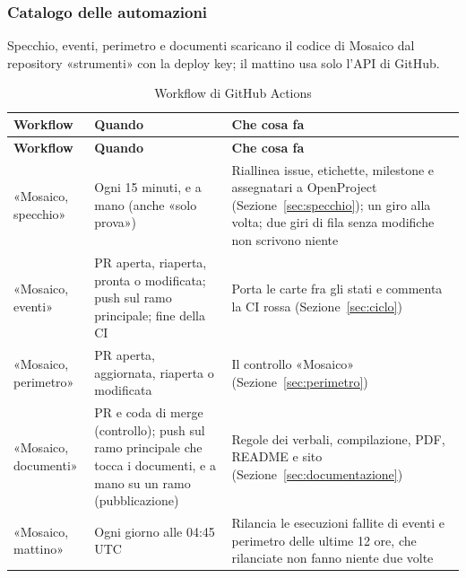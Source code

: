 \documentclass[a4paper, 11pt]{article}
\begin{document}
\subsubsection{Catalogo delle automazioni}\label{sec:automazioni}
Specchio, eventi, perimetro e documenti scaricano il codice di Mosaico dal repository «strumenti» con la deploy key; il mattino usa solo l'API di GitHub.

\begin{xltabular}{\textwidth}{@{} >{\raggedright\arraybackslash}p{0.2\textwidth} >{\raggedright\arraybackslash}p{0.27\textwidth} X @{}}
\caption{Workflow di GitHub Actions}\label{tab:workflow}\\
\toprule
\textbf{Workflow} & \textbf{Quando} & \textbf{Che cosa fa} \\
\midrule
\endfirsthead
\toprule
\textbf{Workflow} & \textbf{Quando} & \textbf{Che cosa fa} \\
\midrule
\endhead
«Mosaico, specchio» & Ogni 15 minuti, e a mano (anche «solo prova») & Riallinea issue, etichette, milestone e assegnatari a OpenProject (Sezione~\ref{sec:specchio}); un giro alla volta; due giri di fila senza modifiche non scrivono niente \\
«Mosaico, eventi» & PR aperta, riaperta, pronta o modificata; push sul ramo principale; fine della CI & Porta le carte fra gli stati e commenta la CI rossa (Sezione~\ref{sec:ciclo}) \\
«Mosaico, perimetro» & PR aperta, aggiornata, riaperta o modificata & Il controllo «Mosaico» (Sezione~\ref{sec:perimetro}) \\
«Mosaico, documenti» & PR e coda di merge (controllo); push sul ramo principale che tocca i documenti, e a mano su un ramo (pubblicazione) & Regole dei verbali, compilazione, PDF, README e sito (Sezione~\ref{sec:documentazione}) \\
«Mosaico, mattino» & Ogni giorno alle 04:45 UTC & Rilancia le esecuzioni fallite di eventi e perimetro delle ultime 12 ore, che rilanciate non fanno niente due volte \\
\bottomrule
\end{xltabular}
\end{document}

